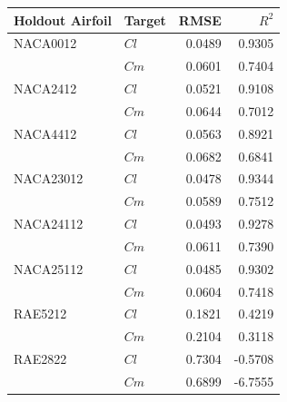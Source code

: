 \begin{tabular}{llrr}
\toprule
Holdout Airfoil & Target & RMSE & $R^2$ \\ \midrule
NACA0012 & $Cl$ & 0.0489 & 0.9305 \\
 & $Cm$ & 0.0601 & 0.7404 \\
NACA2412 & $Cl$ & 0.0521 & 0.9108 \\
 & $Cm$ & 0.0644 & 0.7012 \\
NACA4412 & $Cl$ & 0.0563 & 0.8921 \\
 & $Cm$ & 0.0682 & 0.6841 \\
NACA23012 & $Cl$ & 0.0478 & 0.9344 \\
 & $Cm$ & 0.0589 & 0.7512 \\
NACA24112 & $Cl$ & 0.0493 & 0.9278 \\
 & $Cm$ & 0.0611 & 0.7390 \\
NACA25112 & $Cl$ & 0.0485 & 0.9302 \\
 & $Cm$ & 0.0604 & 0.7418 \\
RAE5212 & $Cl$ & 0.1821 & 0.4219 \\
 & $Cm$ & 0.2104 & 0.3118 \\
RAE2822 & $Cl$ & 0.7304 & -0.5708 \\
 & $Cm$ & 0.6899 & -6.7555 \\
\bottomrule
\end{tabular}